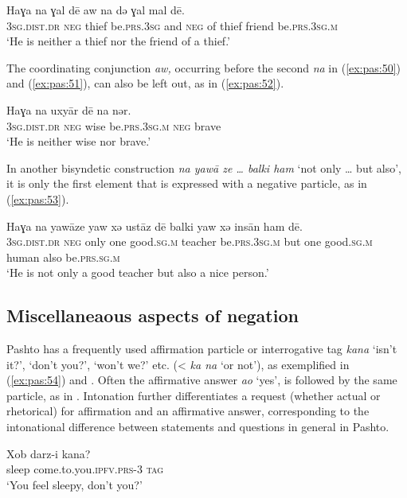 \documentclass[output=paper,colorlinks,citecolor=brown]{langscibook}
\begin{document}
\ea\label{ex:pas:51} 
    \gll Haɣa na ɣal d\={e}  aw na də ɣal mal d\={e}.  \\ 
    \textsc{3sg.dist.dr} \textsc{neg} thief be.\textsc{prs.3sg} and \textsc{neg} of thief friend be.\textsc{prs.3sg.m}  \\
    \glt ‘He is neither a thief nor the friend of a thief.’
\z 

The coordinating conjunction \textit{aw,} occurring before the second \textit{na} in (\ref{ex:pas:50}) and (\ref{ex:pas:51}), can also be left out, as in (\ref{ex:pas:52}).

\ea\label{ex:pas:52} 
    \gll Haɣa na uxyār d\={e} na nər.\\ 
          \textsc{3sg.dist.dr} \textsc{neg} wise be.\textsc{prs.3sg.m} \textsc{neg} brave\\
    \glt ‘He is neither wise nor brave.’
\z 

In another bisyndetic construction \textit{na yaw\={a} ze … balki ham} ‘not only … but also’, it is only the first element that is expressed with a negative particle, as in (\ref{ex:pas:53}).

\ea\label{ex:pas:53} 
    \gll Haɣa na yaw\={a}ze yaw xə ust\={a}z d\={e} balki yaw xə ins\={a}n ham d\={e}. \\ 
          \textsc{3sg.dist.dr} \textsc{neg} only one good.\textsc{sg.m} teacher be.\textsc{prs.3sg.m} but one good.\textsc{sg.m} human also be.\textsc{prs.sg.m}\\
    \glt ‘He is not only a good teacher but also a nice person.’
\z 

\subsection{Miscellaneaous aspects of negation}\label{sec:pas:4.6}
Pashto has a frequently used affirmation particle or interrogative tag \textit{kana} ‘isn’t it?’, ‘don’t you?’, ‘won’t we?’ etc. (< \textit{ka na} ‘or not’), as exemplified in (\ref{ex:pas:54}) and . Often the affirmative answer \textit{ao} ‘yes’, is followed by the same particle, as in .
Intonation further differentiates a request (whether actual or rhetorical) for affirmation and an affirmative answer, corresponding to the intonational difference between statements and questions in general in Pashto.

\ea\label{ex:pas:54} 
    \gll Xob darz-i kana? \\ 
          sleep come.to.you.\textsc{ipfv.prs-3} \textsc{tag}\\
    \glt ‘You feel sleepy, don’t you?’
\z 
\end{document}
